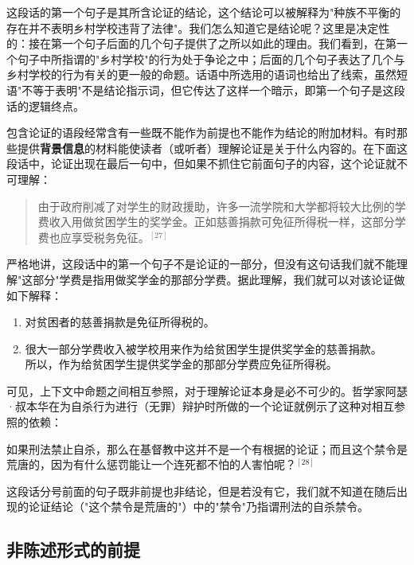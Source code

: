 这段话的第一个句子是其所含论证的结论，这个结论可以被解释为"种族不平衡的存在并不表明乡村学校违背了法律"。我们怎么知道它是结论呢？这里是决定性的：接在第一个句子后面的几个句子提供了之所以如此的理由。我们看到，在第一个句子中所指谓的"乡村学校"的行为处于争论之中；后面的几个句子表达了几个与乡村学校的行为有关的更一般的命题。话语中所选用的语词也给出了线索，虽然短语"不等于表明"不是结论指示词，但它传达了这样一个暗示，即第一个句子是这段话的逻辑终点。

包含论证的语段经常含有一些既不能作为前提也不能作为结论的附加材料。有时那些提供\textbf{背景信息}的材料能使读者（或听者）理解论证是关于什么内容的。在下面这段话中，论证出现在最后一句中，但如果不抓住它前面句子的内容，这个论证就不可理解：

\begin{quotation}
由于政府削减了对学生的财政援助，许多一流学院和大学都将较大比例的学费收入用做贫困学生的奖学金。正如慈善捐款可免征所得税一样，这部分学费也应享受税务免征。${}^{[27]}$
\end{quotation}

严格地讲，这段话中的第一个句子不是论证的一部分，但没有这句话我们就不能理解"这部分"学费是指用做奖学金的那部分学费。据此理解，我们就可以对该论证做如下解释：

\begin{enumerate}
  \item 对贫困者的慈善捐款是免征所得税的。
  \item 很大一部分学费收入被学校用来作为给贫困学生提供奖学金的慈善捐款。\\
  所以，作为给贫困学生提供奖学金的那部分学费应免征所得税。
\end{enumerate}

可见，上下文中命题之间相互参照，对于理解论证本身是必不可少的。哲学家阿瑟·叔本华在为自杀行为进行（无罪）辩护时所做的一个论证就例示了这种对相互参照的依赖：

\begin{displayquote}
如果刑法禁止自杀，那么在基督教中这并不是一个有根据的论证；而且这个禁令是荒唐的，因为有什么惩罚能让一个连死都不怕的人害怕呢？${}^{[28]}$
\end{displayquote}

这段话分号前面的句子既非前提也非结论，但是若没有它，我们就不知道在随后出现的论证结论（"这个禁令是荒唐的"）中的"禁令"乃指谓刑法的自杀禁令。

\subsection{非陈述形式的前提}

